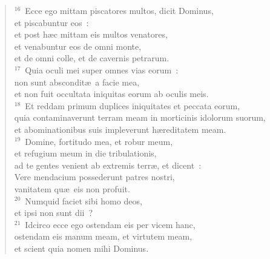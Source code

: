 \begin{flushleft}
\begin{verse}
${}^{16}$~Ecce ego mittam piscatores multos, dicit Dominus,\\ et piscabuntur eos~:\\ et post h\ae c mittam eis multos venatores,\\ et venabuntur eos de omni monte,\\ et de omni colle, et de cavernis petrarum.\\
${}^{17}$~Quia oculi mei super omnes vias eorum~:\\ non sunt abscondit\ae\ a facie mea,\\ et non fuit occultata iniquitas eorum ab oculis meis.\\
${}^{18}$~Et reddam primum duplices iniquitates et peccata eorum,\\ quia contaminaverunt terram meam in morticinis idolorum suorum,\\ et abominationibus suis impleverunt h\ae reditatem meam.\\
${}^{19}$~Domine, fortitudo mea, et robur meum,\\ et refugium meum in die tribulationis,\\ ad te gentes venient ab extremis terr\ae , et dicent~:\\ Vere mendacium possederunt patres nostri,\\ vanitatem qu\ae\ eis non profuit.\\
${}^{20}$~Numquid faciet sibi homo deos,\\ et ipsi non sunt dii~?\\
${}^{21}$~Idcirco ecce ego ostendam eis per vicem hanc,\\ ostendam eis manum meam, et virtutem meam,\\ et scient quia nomen mihi Dominus.\end{verse}\end{flushleft}



